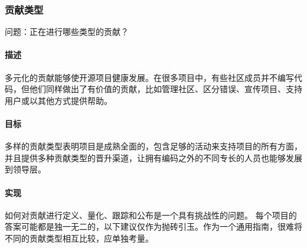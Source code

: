 \hypertarget{ux8d21ux732eux7c7bux578b}{%
\subsubsection{贡献类型}\label{ux8d21ux732eux7c7bux578b}}

问题：正在进行哪些类型的贡献？

\hypertarget{ux63cfux8ff0}{%
\paragraph{描述}\label{ux63cfux8ff0}}

多元化的贡献能够使开源项目健康发展。在很多项目中，有些社区成员并不编写代码，但他们同样做出了有价值的贡献，比如管理社区、区分错误、宣传项目、支持用户或以其他方式提供帮助。

\hypertarget{ux76eeux6807}{%
\paragraph{目标}\label{ux76eeux6807}}

多样的贡献类型表明项目是成熟全面的，包含足够的活动来支持项目的所有方面，并且提供多种贡献类型的晋升渠道，让拥有编码之外的不同专长的人员也能够发展到领导层。

\hypertarget{ux5b9eux73b0}{%
\paragraph{实现}\label{ux5b9eux73b0}}

如何对贡献进行定义、量化、跟踪和公布是一个具有挑战性的问题。
每个项目的答案可能都是独一无二的，以下建议仅作为抛砖引玉。作为一个通用指南，很难将不同的贡献类型相互比较，应单独考量。

